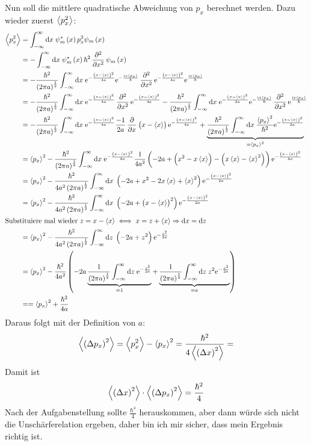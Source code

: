 Nun soll die mittlere quadratische Abweichung von $p_x$ berechnet werden. Dazu wieder zuerst $\left\langle p_x^2\right\rangle$:
\begin{align*}
	\mw{p_x^2}&=\ui{x}\psi_m^*\del{x}p_x^2\psi_m\del{x}\\
	&=-\ui{x}\psi_m^*\del{x}\hbar^2\dpd[2]{}{x}\psi_m\del{x}\\
	&=-\frac{\hbar^2}{\del{2\pi a}^{\frac12}}\ui{x}\ee^{-\frac{\del{x-\mw{x}}^2}{4a}}\ee^{-\frac{\ii x\mw{p_x}}{\hbar}}
	\dpd[2]{}{x}\ee^{-\frac{\del{x-\mw{x}}^2}{4a}}\ee^{\frac{\ii x\mw{p_x}}{\hbar}}\\
	&=-\frac{\hbar^2}{\del{2\pi a}^{\frac12}}\ui{x}\ee^{-\frac{\del{x-\mw{x}}^2}{4a}}\dpd[2]{}{x}\ee^{-\frac{\del{x-\mw{x}}^2}{4a}}
	-\frac{\hbar^2}{\del{2\pi a}^{\frac12}}\ui{x}\ee^{-\frac{\del{x-\mw{x}}^2}{2a}}\ee^{-\frac{\ii x\mw{p_x}}{\hbar}}
	\dpd[2]{}{x}\ee^{\frac{\ii x\mw{p_x}}{\hbar}}\\
	&=-\frac{\hbar^2}{\del{2\pi a}^{\frac12}}\ui{x}\ee^{-\frac{\del{x-\mw{x}}^2}{4a}}
	\frac{-1}{2a}\dpd{}x\del{x-\mw{x}}\ee^{-\frac{\del{x-\mw{x}}^2}{4a}}
	+\underbrace{\frac{\hbar^2}{\del{2\pi a}^{\frac12}}\ui{x}\frac{\mw{p_x}^2}{\hbar^2}\ee^{-\frac{\del{x-\mw{x}}^2}{2a}}}_{=\mw{p_x}^2}\\
	&=\mw{p_x}^2-\frac{\hbar^2}{\del{2\pi a}^{\frac12}}\ui{x}\ee^{-\frac{\del{x-\mw{x}}^2}{4a}}
	\frac1{4a^2}\del{-2a+\del{x^2-x\mw{x}}-\del{x\mw{x}-\mw{x}^2}}\ee^{-\frac{\del{x-\mw{x}}^2}{4a}}\\
	&=\mw{p_x}^2-\frac{\hbar^2}{4a^2\del{2\pi a}^{\frac12}}\ui{x}\del{-2a+x^2-2x\mw{x}+\mw{x}^2}\ee^{-\frac{\del{x-\mw{x}}^2}{2a}}\\
	&=\mw{p_x}^2-\frac{\hbar^2}{4a^2\del{2\pi a}^{\frac12}}\ui{x}\del{-2a+\del{x-\mw{x}}^2}\ee^{-\frac{\del{x-\mw{x}}^2}{2a}}\\
	\intertext{%
		Substituiere mal wieder $z=x-\mw{x}\iff x=z+\mw{x}\Rightarrow\dif x=\dif z$
	}
	&=\mw{p_x}^2-\frac{\hbar^2}{4a^2\del{2\pi a}^{\frac12}}\ui{z}\del{-2a+z^2}\ee^{-\frac{z^2}{2a}}\\
	&=\mw{p_x}^2-\frac{\hbar^2}{4a^2}\del{-2a\underbrace{\frac1{\del{2\pi a}^{\frac12}}\ui{z}\ee^{-\frac{z^2}{2a}}}_{=1}
	+\underbrace{\frac1{\del{2\pi a}^{\frac12}}\ui{z}z^2\ee^{-\frac{z^2}{2a}}}_{=a}}\\
	&==\mw{p_x}^2+\frac{\hbar^2}{4a}
\end{align*}
Daraus folgt mit der Definition von $a$:
\[
	\mw{\del{\Delta p_x}^2}=\mw{p_x^2}-\mw{p_x}^2=\frac{\hbar^2}{4\mw{\del{\Delta x}^2}}=
\]
Damit ist
\[
	\mw{\del{\Delta x}^2}\cdot\mw{\del{\Delta p_x}^2}=\frac{\hbar^2}4
\]
Nach der Aufgabenstellung sollte $\frac{\hbar^4}4$ herauskommen, aber dann würde sich nicht die Unschärferelation ergeben, daher bin ich mir sicher, dass mein Ergebnis richtig ist.




